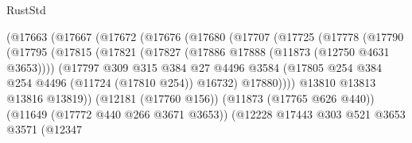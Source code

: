 \begin{lexlean}{RustStd}
\begin{coremodule}
                              (@17663
                                (@17667
                                  (@17672
                                    (@17676
                                      (@17680
                                        (@17707
                                          (@17725
                                            (@17778
                                              (@17790
                                                (@17795
                                                  (@17815
                                                    (@17821
                                                      (@17827
                                                        (@17886
                                                          @17888
                                                          (@11873 (@12750 @4631 @3653))))
                                                      (@17797
                                                        @309
                                                        @315
                                                        @384
                                                        @27
                                                        @4496
                                                        @3584
                                                        (@17805
                                                          @254
                                                          @384
                                                          @254
                                                          @4496
                                                          (@11724 (@17810 @254))
                                                          @16732)
                                                        @17880))))
                                                @13810
                                                @13813
                                                @13816
                                                @13819))
                                            (@12181 (@17760 @156))
                                            (@11873 (@17765 @626 @440))
                                            (@11649 (@17772 @440 @266 @3671 @3653))
                                            (@12228
                                              @17443
                                              @303
                                              @521
                                              @3653
                                              @3571
                                              (@12347

\end{coremodule}
\end{lexlean}
